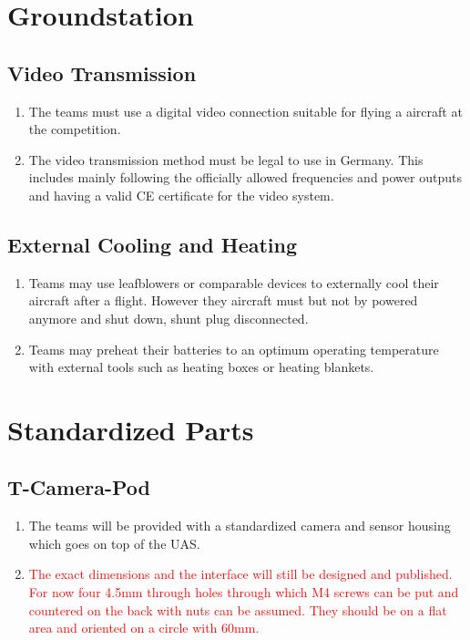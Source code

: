 \documentclass{article}
\begin{document}
\section{Groundstation}
\subsection{Video Transmission}
\begin{enumerate}
  \item The teams must use a digital video connection suitable for flying a aircraft at the competition.  
  \item The video transmission method must be legal to use in Germany. This includes mainly following the officially allowed frequencies and power outputs and having a valid CE certificate for the video system.
\end{enumerate}

\subsection{External Cooling and Heating}
\begin{enumerate}
  \item Teams may use leafblowers or comparable devices to externally cool their aircraft after a flight. However they aircraft must but not by powered anymore and shut down, shunt plug disconnected.  
  \item Teams may preheat their batteries to an optimum operating temperature with external tools such as heating boxes or heating blankets.
\end{enumerate}

\section{Standardized Parts}

\subsection{T-Camera-Pod}
\begin{enumerate}
  \item The teams will be provided with a standardized camera and sensor housing which goes on top of the UAS.
  \item \textcolor{red}{The exact dimensions and the interface will still be designed and published. For now four 4.5mm through holes through which M4 screws can be put and countered on the back with nuts can be assumed. They should be on a flat area and oriented on a circle with 60mm.}
\end{enumerate}
\end{document}
